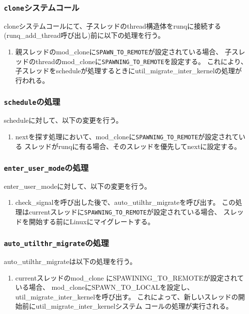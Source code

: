 \documentclass[twoside,11pt,fleqn]{book}
\begin{document}
\subsubsection{\texttt{clone}システムコール}
cloneシステムコールにて、子スレッドのthread構造体をrunqに接続する
(runq\_add\_thread呼び出し)前に以下の処理を行う。
\begin{enumerate}
\item 親スレッドのmod\_cloneに\texttt{SPAWN\_TO\_REMOTE}が設定されている場合、
子スレッドのthreadのmod\_cloneに\texttt{SPAWNING\_TO\_REMOTE}を設定する。
これにより、子スレッドをscheduleが処理するときにutil\_migrate\_inter\_kernelの処理が行われる。
\end{enumerate}

\subsubsection{\texttt{schedule}の処理}
scheduleに対して、以下の変更を行う。
\begin{enumerate}
\item nextを探す処理において、mod\_cloneに\texttt{SPAWNING\_TO\_REMOTE}が設定されている
スレッドがrunqに有る場合、そのスレッドを優先してnextに設定する。
\end{enumerate}

\subsubsection{\texttt{enter\_user\_mode}の処理}
enter\_user\_modeに対して、以下の変更を行う。
\begin{enumerate}
\item check\_signalを呼び出した後で、auto\_utilthr\_migrateを呼び出す。
この処理はcurrentスレッドに\texttt{SPAWNING\_TO\_REMOTE}が設定されている場合、
スレッドを開始する前にLinuxにマイグレートする。
\end{enumerate}

\subsubsection{\texttt{auto\_utilthr\_migrate}の処理}
auto\_utilthr\_migrateは以下の処理を行う。
\begin{enumerate}
\item currentスレッドのmod\_clone にSPAWINING\_TO\_REMOTEが設定されている場合、
mod\_cloneにSPAWN\_TO\_LOCALを設定し、
util\_migrate\_inter\_kernelを呼び出す。
これによって、新しいスレッドの開始前にutil\_migrate\_inter\_kernelシステム
コールの処理が実行される。
\end{enumerate}
\end{document}
